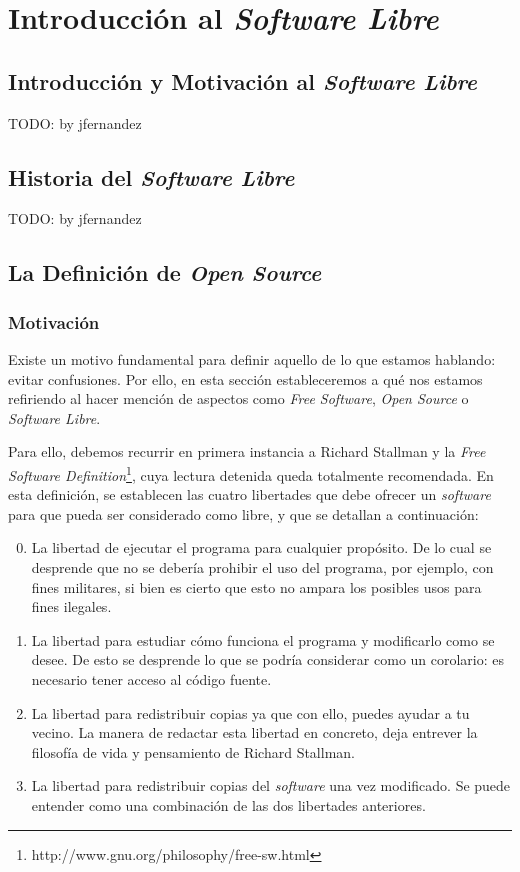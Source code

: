 \chapter{Introducción al \textit{Software Libre}}
\section{Introducción y Motivación al \textit{Software Libre}}

TODO: by jfernandez

\section{Historia del \textit{Software Libre}}

TODO: by jfernandez

\section{La Definición de \textit{Open Source}}

\subsection{Motivación}

Existe un motivo fundamental para definir aquello de lo que estamos hablando:
evitar confusiones. Por ello, en esta sección estableceremos a qué nos estamos
refiriendo al hacer mención de aspectos como \textit{Free Software},
\textit{Open Source} o \textit{Software Libre}.

Para ello, debemos recurrir en primera instancia a Richard Stallman y la
\textit{Free
Software Definition}\footnote{http://www.gnu.org/philosophy/free-sw.html}, cuya
lectura detenida queda totalmente recomendada. En esta definición, se establecen
las cuatro libertades que debe ofrecer un \textit{software} para que pueda ser
considerado como libre, y que se detallan a continuación:

\begin{enumerate}
  \setcounter{enumi}{-1}
  \item La libertad de ejecutar el programa para cualquier propósito. De lo
cual se desprende que no se debería prohibir el uso del programa, por ejemplo,
con fines militares, si bien es cierto que esto no ampara los posibles usos para
fines ilegales.
  \item La libertad para estudiar cómo funciona el programa y modificarlo como
se desee. De esto se desprende lo que se podría considerar como un corolario:
es necesario tener acceso al código fuente.
  \item La libertad para redistribuir copias ya que con ello, puedes ayudar a
tu vecino. La manera de redactar esta libertad en concreto, deja entrever la
filosofía de vida y pensamiento de Richard Stallman.
  \item La libertad para redistribuir copias del \textit{software} una vez
modificado. Se puede entender como una combinación de las dos libertades
anteriores.
\end{enumerate}


